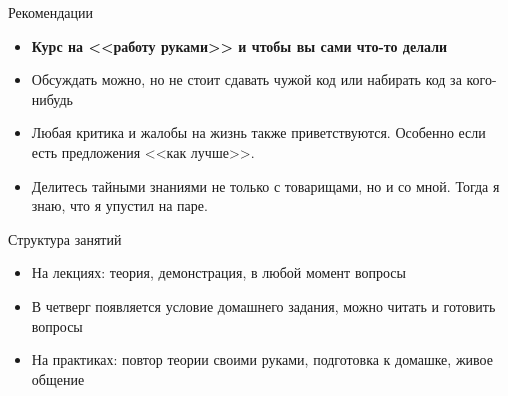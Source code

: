 \begin{frame}[t]{Рекомендации}
	\begin{itemize}
		\item \textbf{Курс на <<работу руками>> и чтобы вы сами что-то делали}
		\item Обсуждать можно, но не стоит сдавать чужой код или набирать код за кого-нибудь
		\item
			Любая критика и жалобы на жизнь также приветствуются.
			Особенно если есть предложения <<как лучше>>.
		\item
			Делитесь тайными знаниями не только с товарищами, но и со мной.
			Тогда я знаю, что я упустил на паре.
	\end{itemize}
\end{frame}

\begin{frame}[t]{Структура занятий}
	\begin{itemize}
		\item На лекциях: теория, демонстрация, в любой момент вопросы
		\item В четверг появляется условие домашнего задания, можно читать и готовить вопросы
		\item На практиках: повтор теории своими руками, подготовка к домашке, живое общение
	\end{itemize}
\end{frame}
